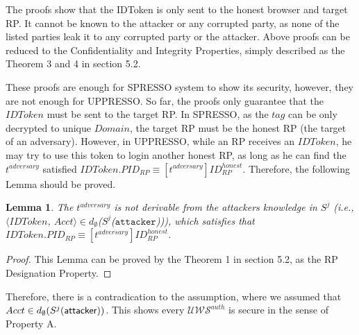 \documentclass[letterpaper,onecolumn,10pt]{article}
\newtheorem{lemma}{Lemma}
\begin{document}
The proofs show that the IDToken is only sent to the honest browser and target RP.
It cannot be known to the attacker or any corrupted party, as none of the listed 
parties leak it to any corrupted party or the attacker. 
Above proofs can be reduced to the {\color{blue}Confidentiality and Integrity 
Properties}, simply described as the {\color{blue} Theorem 3 and 4} in section 5.2.


These proofs are enough for SPRESSO system to show its security, however, they are not enough for UPPRESSO.
So far, the proofs only guarantee that the $IDToken$ must be sent to the target RP.
In SPRESSO, as the $tag$ can be only decrypted to unique $Domain$, the target RP must be the honest RP (the target of an adversary).
However, in UPPRESSO, while an RP receives an $IDToken$, he may try to use this token to login another honest RP, as long as he can find the $t^{adversary}$ satisfied $IDToken.PID_{RP} \equiv [t^{adversary}]ID_{RP}^{honest}$.
Therefore, the following Lemma should be proved.

\begin{lemma}
The $t^{adversary}$ is not derivable from the attackers knowledge in $S^j$ (i.e., $\langle IDToken$, $Acct \rangle \in d_{\emptyset}$($S^j$($\mathtt{attacker}$))), which satisfies that $IDToken.PID_{RP} \equiv [t^{adversary}]ID_{RP}^{honest}$.
\end{lemma}
\begin{proof}
This Lemma can be proved by the {\color{blue} Theorem 1} in section 5.2, as the {\color{blue} RP Designation Property}.
\end{proof}

Therefore, there is a contradication to the assumption, where we assumed that 
$Acct \in d_{\emptyset}(S^j(\mathsf{attacker}))$. 
This shows every $\mathcal{U\!W\!S}^{auth}$ is secure in the sense of Property A.
\end{document}
